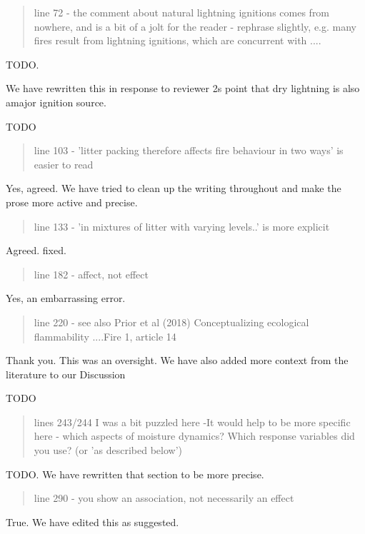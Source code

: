 \documentclass[letterpaper, 12pt]{letter}
\begin{document}
\begin{letter}{}
\begin{quote}
line 72 - the comment about natural lightning ignitions comes from nowhere, and is a  bit of a jolt for the reader - rephrase slightly, e.g. many fires result from lightning ignitions, which are concurrent with ....
\end{quote}

TODO.

We have rewritten this in response to reviewer 2s point that dry lightning is also amajor ignition source.

TODO


\begin{quote}
line 103 - 'litter packing therefore affects fire behaviour in two ways' is easier to read
\end{quote}

Yes, agreed. We have tried to clean up the writing throughout and make the prose more active and precise.

\begin{quote}
line 133 - 'in mixtures of litter with varying levels..' is more explicit
\end{quote}

Agreed. fixed.

\begin{quote}
line 182 - affect, not effect
\end{quote}

Yes, an embarrassing error.


\begin{quote}
line 220 - see also Prior et al (2018)  Conceptualizing ecological flammability ....Fire 1, article 14
\end{quote}

Thank you. This was an oversight. We have also added more context from the
literature to our Discussion

TODO

\begin{quote}
lines 243/244 I was a bit puzzled here -It would help to be more specific here - which aspects of moisture dynamics? Which response variables did you use?  (or 'as described below')
\end{quote}

TODO. We have rewritten that section to be more precise.

\begin{quote}
line 290 - you show an association, not necessarily an effect
\end{quote}

True. We have edited this as suggested.


\end{letter}
\end{document}

